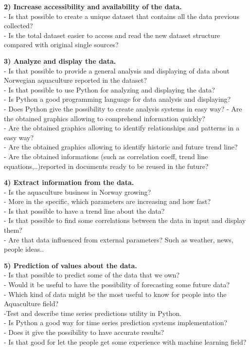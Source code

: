  
\textbf{2) Increase accessibility and availability of the data.}\\
- Is that possible to create a unique dataset that contains all the data previous collected?\\
- Is the total dataset easier to access and read the new dataset structure compared with original single sources?

 
\textbf{3) Analyze and display the data.}\\
- Is that possible to provide a general analysis and displaying of data about Norwegian aquaculture reported in the dataset?\\
- Is that possible to use Python for analyzing and displaying the data?\\
	- Is Python a good programming language for data analysis and displaying?\\
	- Does Python give the possibility to create analysis systems in easy way?
- Are the obtained graphics allowing to comprehend information quickly?\\
- Are the obtained graphics allowing to identify relationships and patterns in a easy way?\\
- Are the obtained graphics allowing to identify historic and future trend line?\\
- Are the obtained informations (such as correlation coeff, trend line equations,..)reported in documents ready to be reused in the future?
 
\textbf{4) Extract information from the data.}	\\
- Is the aquaculture business in Norway growing? \\
- More in the specific, which parameters are increasing and how fast? \\
- Is that possible to have a trend line about the data? \\
- Is that possible to find some correlations between the data in input and display them? \\
- Are that data influenced from external parameters? Such as weather, news, people ideas..

 
\textbf{5) Prediction of values about the data.}\\
- Is that possible to predict some of the data that we own?\\
		- Would it be useful to have the possibility of forecasting some future data?\\
		- Which kind of data might be the most useful to know for people into the Aquaculture field?\\
-Test and describe time series predictions utility in Python.\\
		- Is Python a good way for time series prediction systems implementation?\\
		- Does it give the possibility to have accurate results?\\
		- Is that good for let the people get some experience with machine learning field?


